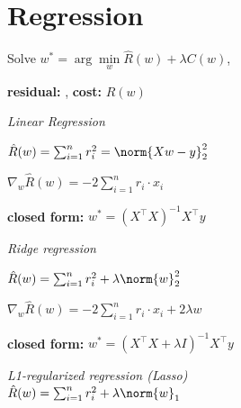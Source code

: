 \section{Regression}

Solve $w^* = \arg\min\limits_w \hat{R}(w)+ \lambda C(w)$, 

\textbf{residual:} , \enskip
\textbf{cost:} $\hat R(w)$

\emph{Linear Regression}

$\hat{R}(w) = \sum_{i=1}^n r_i^2 = \norm{Xw-y}^2_2$

$\nabla\!_w \hat{R}(w) = -2 \sum_{i=1}^n r_i \cdot x_i$

\textbf{closed form:} $w^* = (X^\top X)^{-1} X^\top y$


\emph{Ridge regression}

$\hat{R}(w) = \sum_{i=1}^n r_i^2 + \lambda \norm{w}_2^2$

$\nabla\!_w \hat{R}(w) = -2 \sum_{i=1}^n r_i \cdot x_i + 2 \lambda w$

\textbf{closed form:} $w^*=(X^\top X + \lambda I)^{-1} X^\top y$

\emph{L1-regularized regression (Lasso)}\\
$\hat{R}(w) = \sum_{i=1}^n r_i^2 + \lambda \norm{w}_1$